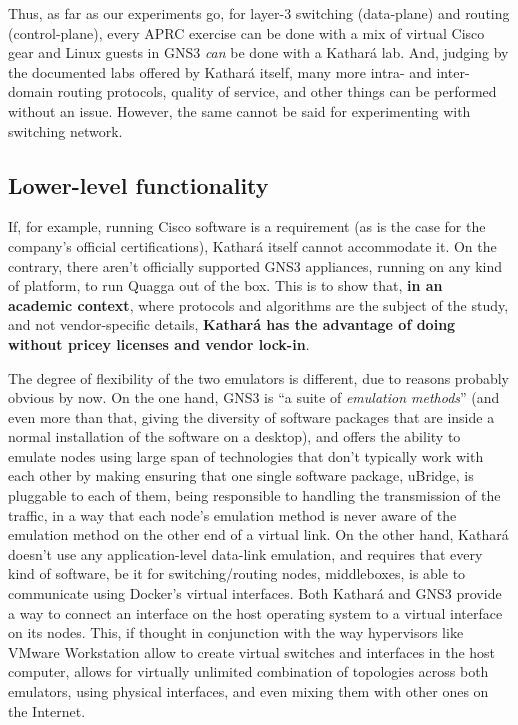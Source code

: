 Thus, as far as our experiments go, for layer-3 switching (data-plane) and routing (control-plane), every APRC exercise can be done with a mix of virtual Cisco gear and Linux guests in GNS3 \emph{can} be done with a Kathará lab.
And, judging by the documented labs offered by Kathará itself, many more intra- and inter-domain routing protocols, quality of service, and other things can be performed without an issue.
However, the same cannot be said for experimenting with switching network. %

\subsection{Lower-level functionality}

If, for example, running Cisco software is a requirement (as is the case for the company's official certifications), Kathará itself cannot accommodate it.
On the contrary, there aren't officially supported GNS3 appliances, running on any kind of platform, to run Quagga out of the box.
This is to show that, \textbf{in an academic context}, where protocols and algorithms are the subject of the study, and not vendor-specific details, \textbf{Kathará has the advantage of doing without pricey licenses and vendor lock-in}.

The degree of flexibility of the two emulators is different, due to reasons probably obvious by now.
On the one hand, GNS3 is ``a suite of \emph{emulation methods}'' (and even more than that, giving the diversity of software packages that are inside a normal installation of the software on a desktop), and offers the ability to emulate nodes using large span of technologies that don't typically work with each other by making ensuring that one single software package, uBridge, is pluggable to each of them, being responsible to handling the transmission of the traffic, in a way that each node's emulation method is never aware of the emulation method on the other end of a virtual link.
On the other hand, Kathará doesn't use any application-level data-link emulation, and requires that every kind of software, be it for switching/routing nodes, middleboxes, is able to communicate using Docker's virtual interfaces.
Both Kathará and GNS3 provide a way to connect an interface on the host operating system to a virtual interface on its nodes.
This, if thought in conjunction with the way hypervisors like VMware Workstation allow to create virtual switches and interfaces in the host computer, allows for virtually unlimited combination of topologies across both emulators, using physical interfaces, and even mixing them with other ones on the Internet.

